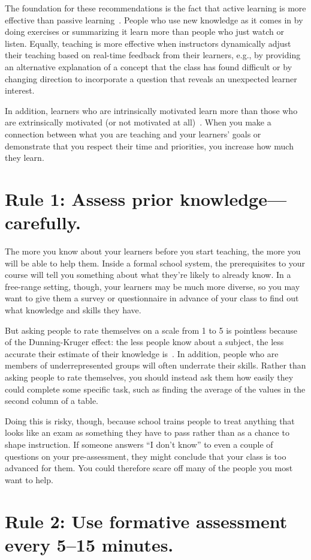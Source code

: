 \documentclass[10pt,letterpaper]{article}
\newcommand{\rulemajor}[1]{\section{#1}}
\begin{document}
The foundation for these recommendations is the fact that
active learning is more effective than passive learning~\cite{Ambr2010,HPL2}.
People who use new knowledge as it comes in by doing exercises or summarizing it
learn more than people who just watch or listen.
Equally,
teaching is more effective when instructors dynamically adjust their teaching
based on real-time feedback from their learners,
e.g.,
by providing an alternative explanation of a concept that the class has found difficult
or by changing direction to incorporate a question that reveals an unexpected learner interest.

In addition,
learners who are intrinsically motivated learn more than those who are extrinsically motivated
(or not motivated at all)~\cite{Wlod2017}.
When you make a connection between what you are teaching and your learners' goals
or demonstrate that you respect their time and priorities,
you increase how much they learn.

\rulemajor{Rule 1: Assess prior knowledge---carefully.}

The more you know about your learners before you start teaching,
the more you will be able to help them.
Inside a formal school system,
the prerequisites to your course will tell you something about
what they're likely to already know.
In a free-range setting,
though,
your learners may be much more diverse,
so you may want to give them a survey or questionnaire in advance of your class
to find out what knowledge and skills they have.

But asking people to rate themselves on a scale from 1 to 5 is pointless
because of the Dunning-Kruger effect:
the less people know about a subject,
the less accurate their estimate of their knowledge is~\cite{Krug1999}.
In addition,
people who are members of underrepresented groups will often underrate their skills.
Rather than asking people to rate themselves,
you should instead ask them how easily they could complete some specific task,
such as finding the average of the values in the second column of a table.

Doing this is risky,
though,
because school trains people
to treat anything that looks like an exam as something they have to pass
rather than as a chance to shape instruction.
If someone answers ``I don't know'' to even a couple of questions on your pre-assessment,
they might conclude that your class is too advanced for them.
You could therefore scare off many of the people you most want to help.

\rulemajor{Rule 2: Use formative assessment every 5--15 minutes.}
\end{document}
